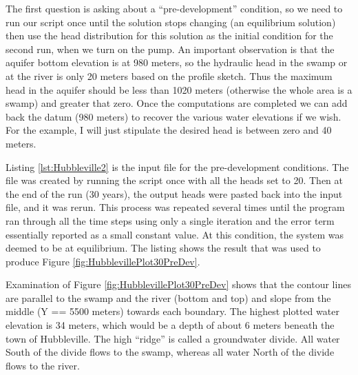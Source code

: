The first question is asking about a ``pre-development'' condition, so we need to run our script once until the solution stops changing (an equilibrium solution) then use the head distribution for this solution as the initial condition for the second run, when we turn on the pump.
An important observation is that the aquifer bottom elevation is at 980 meters, so the hydraulic head in the swamp or at the river is only 20 meters based on the profile sketch.
Thus the maximum head in the aquifer should be less than 1020 meters (otherwise the whole area is a swamp) and greater that zero.
Once the computations are completed we can add back the datum (980 meters) to recover the various water elevations if we wish.
For the example, I will just stipulate the desired head is between zero and 40 meters.

Listing \ref{lst:Hubbleville2} is the input file for the pre-development conditions. 
The file was created by running the script once with all the heads set to 20.  
Then at the end of the run (30 years), the output heads were pasted back into the input file, and it was rerun.
This process was repeated several times until the program ran through all the time steps using only a single iteration and the error term essentially reported as a small constant value.
At this condition, the system was deemed to be at equilibrium.  
The listing shows the result that was used to produce Figure \ref{fig:HubblevillePlot30PreDev}.

Examination of Figure \ref{fig:HubblevillePlot30PreDev} shows that the contour lines are parallel to the swamp and the river (bottom and top) and slope from the middle (Y == 5500 meters) towards each boundary. 
The highest plotted water elevation is 34 meters, which would be a depth of about 6 meters beneath the town of Hubbleville.
The high ``ridge'' is called a groundwater divide.  
All water South of the divide flows to the swamp, whereas all water North of the divide flows to the river.

